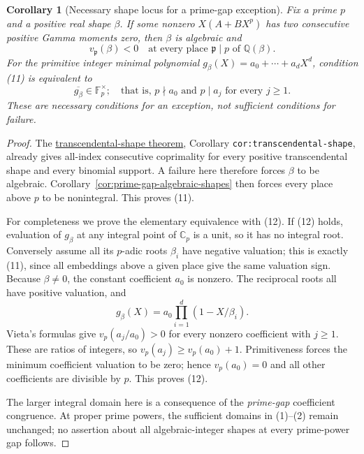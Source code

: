 \documentclass[11pt]{article}
\newtheorem{corollary}[lemma]{Corollary}
\newcommand{\Cp}{\mathbb C_p}
\newcommand{\Q}{\mathbb Q}
\begin{document}
\begin{corollary}[Necessary shape locus for a prime-gap exception]
\label{cor:prime-gap-exception-locus}
Fix a prime $p$ and a positive real shape $\beta$.
If some nonzero $X(A+BX^p)$ has two consecutive positive
Gamma moments zero, then $\beta$ is algebraic and
\[
 v_{\mathfrak p}(\beta)<0
 \quad\text{at every place }\mathfrak p\mid p
 \text{ of }\Q(\beta).
 \tag{11}
\]
For the primitive integer minimal polynomial
$g_\beta(X)=a_0+\cdots+a_dX^d$, condition (11) is equivalent to
\[
 \overline{g_\beta}\in\mathbb F_p^\times;
 \quad\text{that is, }p\nmid a_0
 \text{ and }p\mid a_j\text{ for every }j\ge1.
 \tag{12}
\]
These are necessary conditions for an exception, not sufficient
conditions for failure.
\end{corollary}
\begin{proof}
The \href{BINOMIAL_IRREDUCIBILITY_REDUCTION.tex}{transcendental-shape theorem},
Corollary \texttt{cor:transcendental-shape}, already gives all-index
consecutive coprimality for every positive transcendental shape and
every binomial support. A failure here therefore forces $\beta$ to
be algebraic. Corollary~\ref{cor:prime-gap-algebraic-shapes} then
forces every place above $p$ to be nonintegral. This proves (11).

For completeness we prove the elementary equivalence with (12).
If (12) holds, evaluation of $g_\beta$ at any integral point of $\Cp$
is a unit, so it has no integral root.
Conversely assume all its $p$-adic roots $\beta_i$ have negative
valuation; this is exactly (11), since all embeddings above a given
place give the same valuation sign.
Because $\beta\ne0$, the constant coefficient $a_0$ is nonzero.
The reciprocal roots all have positive valuation, and
\[
 g_\beta(X)=a_0\prod_{i=1}^d(1-X/\beta_i).
\]
Vieta's formulas give $v_p(a_j/a_0)>0$ for every nonzero
coefficient with $j\ge1$. These are ratios of integers, so
$v_p(a_j)\ge v_p(a_0)+1$.
Primitiveness forces the minimum coefficient valuation to be zero;
hence $v_p(a_0)=0$ and all other coefficients are divisible by $p$.
This proves (12).

The larger integral domain here is a consequence of the
\emph{prime-gap} coefficient congruence.
At proper prime powers, the sufficient domains in (1)--(2)
remain unchanged; no assertion about all algebraic-integer shapes
at every prime-power gap follows.
\end{proof}
\end{document}
